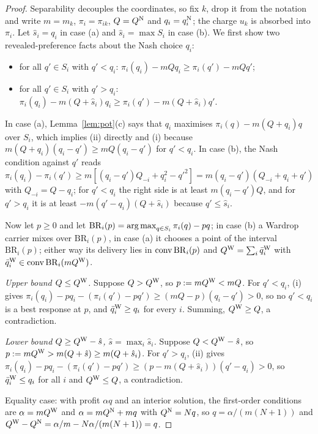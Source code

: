 \begin{proof}
Separability decouples the coordinates, so fix $k$, drop it from the notation and write $m=m_k$, $\pi_i=\pi_{ik}$, $Q=Q^{\mathrm{N}}$ and $q_i=q_i^{\mathrm{N}}$; the charge $u_k$ is absorbed into $\pi_i$. Let $\hat s_i=q_i$ in case (a) and $\hat s_i=\max S_i$ in case (b). We first show two revealed-preference facts about the Nash choice $q_i$:
\begin{itemize}
\item[(i)] for all $q'\in S_i$ with $q'<q_i$: $\pi_i(q_i)-mQq_i\ge\pi_i(q')-mQq'$;
\item[(ii)] for all $q'\in S_i$ with $q'>q_i$: $\pi_i(q_i)-m(Q+\hat s_i)q_i\ge\pi_i(q')-m(Q+\hat s_i)q'$.
\end{itemize}
In case (a), Lemma~\ref{lem:pot}(c) says that $q_i$ maximises $\pi_i(q)-m(Q+q_i)q$ over $S_i$, which implies (ii) directly and (i) because $m(Q+q_i)(q_i-q')\ge mQ(q_i-q')$ for $q'<q_i$. In case (b), the Nash condition against $q'$ reads $\pi_i(q_i)-\pi_i(q')\ge m[(q_i-q')Q_{-i}+q_i^2-q'^2]=m(q_i-q')(Q_{-i}+q_i+q')$ with $Q_{-i}=Q-q_i$; for $q'<q_i$ the right side is at least $m(q_i-q')Q$, and for $q'>q_i$ it is at least $-m(q'-q_i)(Q+\hat s_i)$ because $q'\le\hat s_i$.

Now let $p\ge0$ and let $\mathrm{BR}_i(p)=\operatorname*{arg\,max}_{q\in S_i}\pi_i(q)-pq$; in case (b) a Wardrop carrier mixes over $\mathrm{BR}_i(p)$, in case (a) it chooses a point of the interval $\mathrm{BR}_i(p)$; either way its delivery lies in $\operatorname{conv}\mathrm{BR}_i(p)$ and $Q^{\mathrm{W}}=\sum_i\bar q_i^{\mathrm{W}}$ with $\bar q_i^{\mathrm{W}}\in\operatorname{conv}\mathrm{BR}_i(mQ^{\mathrm{W}})$.

\emph{Upper bound $Q\le Q^{\mathrm{W}}$.} Suppose $Q>Q^{\mathrm{W}}$, so $p:=mQ^{\mathrm{W}}<mQ$. For $q'<q_i$, (i) gives $\pi_i(q_i)-pq_i-(\pi_i(q')-pq')\ge(mQ-p)(q_i-q')>0$, so no $q'<q_i$ is a best response at $p$, and $\bar q_i^{\mathrm{W}}\ge q_i$ for every $i$. Summing, $Q^{\mathrm{W}}\ge Q$, a contradiction.

\emph{Lower bound $Q\ge Q^{\mathrm{W}}-\hat s$, $\hat s=\max_i\hat s_i$.} Suppose $Q<Q^{\mathrm{W}}-\hat s$, so $p:=mQ^{\mathrm{W}}>m(Q+\hat s)\ge m(Q+\hat s_i)$. For $q'>q_i$, (ii) gives $\pi_i(q_i)-pq_i-(\pi_i(q')-pq')\ge(p-m(Q+\hat s_i))(q'-q_i)>0$, so $\bar q_i^{\mathrm{W}}\le q_i$ for all $i$ and $Q^{\mathrm{W}}\le Q$, a contradiction.

Equality case: with profit $\alpha q$ and an interior solution, the first-order conditions are $\alpha=mQ^{\mathrm{W}}$ and $\alpha=mQ^{\mathrm{N}}+mq$ with $Q^{\mathrm{N}}=Nq$, so $q=\alpha/(m(N+1))$ and $Q^{\mathrm{W}}-Q^{\mathrm{N}}=\alpha/m-N\alpha/(m(N+1))=q$.
\end{proof}

